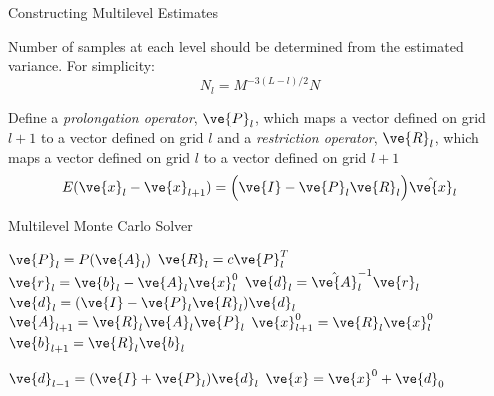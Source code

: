 \documentclass{beamer}
\begin{document}
\begin{frame}{Constructing Multilevel Estimates}

  Number of samples at each level should be determined from the
  estimated variance. For simplicity:
  \[
  N_l = M^{-3(L-l)/2}N
  \]

  \medskip

  Define a \textit{prolongation operator}, $\ve{P}_l$, which maps a
  vector defined on grid $l+1$ to a vector defined on grid $l$ and a
  \textit{restriction operator}, $\ve{R}_l$, which maps a vector
  defined on grid $l$ to a vector defined on grid $l+1$
  \[
  E(\ve{x}_{l} - \ve{x}_{l+1}) = \Big(\ve{I} - \ve{P}_l \ve{R}_l\Big)
  \hat{\ve{x}}_{l}
  \]

\end{frame}

\begin{frame}[fragile]{Multilevel Monte Carlo Solver}

  \begin{algorithm}[H]
    \caption{\small Multilevel Monte Carlo Method}
    \label{alg:mlamc}
    \begin{algorithmic}[1]
      { \small
      \STATE  $\ve{P}_l = P(\ve{A}_l)$
      \STATE $\ve{R}_l = c \ve{P}_l^T$
      \STATE $\ve{r}_l = \ve{b}_l - \ve{A}_l \ve{x}_l^0$
      \STATE $\ve{d}_l = \hat{\ve{A}}_l^{-1} \ve{r}_l$
      \STATE $\ve{d}_l = (\ve{I} - \ve{P}_l\ve{R}_l) \ve{d}_{l}$
      \STATE $\ve{A}_{l+1} = \ve{R}_l \ve{A}_l \ve{P}_l$
      \STATE $\ve{x}_{l+1}^0 = \ve{R}_l \ve{x}_l^0$
      \STATE $\ve{b}_{l+1} = \ve{R}_l \ve{b}_l$
      \ENDIF
      \ENDFOR

      \STATE $\ve{d}_{l-1} = ( \ve{I} + \ve{P}_{l} ) \ve{d}_{l}$
      \ENDFOR
      \STATE $\ve{x} = \ve{x}^0 + \ve{d}_0$
      }
    \end{algorithmic}
  \end{algorithm}

\end{frame}
\end{document}
